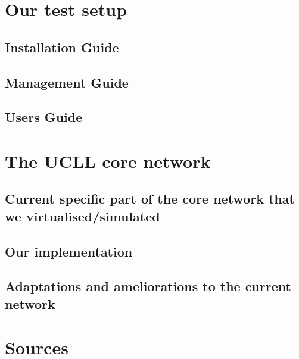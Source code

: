 \documentclass[english]{article}
\begin{document}
	\newpage
	\section{Our test setup}
	\subsection{Installation Guide}
	\subsection{Management Guide}
	\subsection{Users Guide}
	
	\newpage
	\section{The UCLL core network}
	\subsection{Current specific part of the core network that we virtualised/simulated}
	\subsection{Our implementation}
	\subsection{Adaptations and ameliorations to the current network}
	
	\newpage
	\section{Sources}
	
\end{document}
